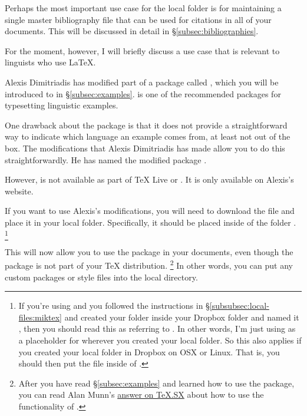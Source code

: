 Perhaps the most important use case for the local  folder is for maintaining a single master bibliography file that can be used for citations in all of your documents.
This will be discussed in detail in \S\ref{subsec:bibliographies}.

For the moment, however, I will briefly discuss a use case that is relevant to linguists who use \LaTeX.

Alexis Dimitriadis has modified part of a package called , which you will be introduced to in \S\ref{subsec:examples}.
 is one of the recommended packages for typesetting linguistic examples.

One drawback about the  package is that it does not provide a straightforward way to indicate which language an example comes from, at least not out of the box.
The modifications that Alexis Dimitriadis has made allow you to do this straightforwardly.
He has named the modified package \href{http://www.let.uu.nl/~Alexis.Dimitriadis/personal/latex/cgloss.sty}{}.

However,  is not available as part of TeX Live or .
It is only available on Alexis's website.

If you want to use Alexis's modifications, you will need to download the file \href{http://www.let.uu.nl/~Alexis.Dimitriadis/personal/latex/cgloss.sty}{} and place it in your local  folder.
Specifically, it should be placed inside of the folder .%
\footnote{%
If you're using  and you followed the instructions in \S\ref{subsubsec:local-files:miktex} and created your  folder inside your Dropbox folder and named it , then you should read this as referring to .
In other words, I'm just using  as a placeholder for wherever you created your local  folder.
So this also applies if you created your local  folder in Dropbox on OSX or Linux.
That is, you should then put the file inside of .%
}

This will now allow you to use the  package in your  documents, even though the package is not part of your \TeX{} distribution.%
\footnote{%
After you have read \S\ref{subsec:examples} and learned how to use the  package, you can read Alan Munn's \href{http://tex.stackexchange.com/a/49583/32888}{answer on TeX.SX} about how to use the functionality of .%
}
In other words, you can put any custom packages or style files into the local  directory.